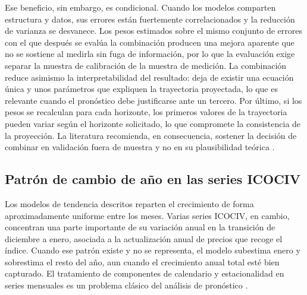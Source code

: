 \documentclass[12pt,letterpaper]{article}
\providecommand{\parencite}{\citep}
\newcommand{\ICOCIV}{ICOCIV}
\begin{document}
Ese beneficio, sin embargo, es condicional. Cuando los modelos comparten estructura y datos, sus errores están fuertemente correlacionados y la reducción de varianza se desvanece. Los pesos estimados sobre el mismo conjunto de errores con el que después se evalúa la combinación producen una mejora aparente que no se sostiene al medirla sin fuga de información, por lo que la evaluación exige separar la muestra de calibración de la muestra de medición. La combinación reduce asimismo la interpretabilidad del resultado: deja de existir una ecuación única y unos parámetros que expliquen la trayectoria proyectada, lo que es relevante cuando el pronóstico debe justificarse ante un tercero. Por último, si los pesos se recalculan para cada horizonte, los primeros valores de la trayectoria pueden variar según el horizonte solicitado, lo que compromete la consistencia de la proyección. La literatura recomienda, en consecuencia, sostener la decisión de combinar en validación fuera de muestra y no en su plausibilidad teórica \parencite{hyndman2021fpp3,tashman2000}.

\subsection{Patrón de cambio de año en las series ICOCIV}

Los modelos de tendencia descritos reparten el crecimiento de forma aproximadamente uniforme entre los meses. Varias series \ICOCIV{}, en cambio, concentran una parte importante de su variación anual en la transición de diciembre a enero, asociada a la actualización anual de precios que recoge el índice. Cuando ese patrón existe y no se representa, el modelo subestima enero y sobrestima el resto del año, aun cuando el crecimiento anual total esté bien capturado. El tratamiento de componentes de calendario y estacionalidad en series mensuales es un problema clásico del análisis de pronóstico \parencite{hyndman2021fpp3}.
\end{document}
